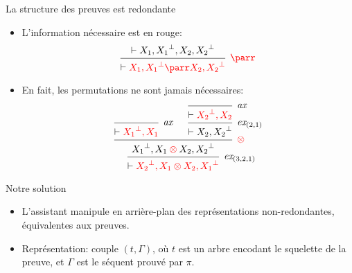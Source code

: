 \documentclass{beamer}
\newcommand*{\orth}{^\perp}
\newcommand*{\tensor}{\otimes}
\newcommand*{\hypv}[1]{\hypo{\vdash #1}}
\newcommand*{\axv}[1]{\infer{0}[\ensuremath{\mathit{ax}}]{\vdash #1}}
\newcommand*{\permv}[2]{\infer{1}[\ensuremath{\textit{ex}_{#1}}]{\vdash #2}}
\newcommand*{\someproof}{\pi}
\newcommand*{\sequent}{\Gamma}
\newcommand*{\foblig}[1]{\textcolor{red}{#1}}
\begin{document}
\begin{frame}{La structure des preuves est redondante}
    \begin{itemize}
        \item L'information nécessaire est en rouge:
            \begin{equation*}
            \begin{prooftree}
                \hypv{X_1, {X_1}\orth, X_2, {X_2}\orth}
                {\infer{1}[\foblig{\ensuremath{\parr}}]{\vdash \foblig{X_1, {X_1}\orth \parr X_2, {X_2}\orth}}}
            \end{prooftree}
            \end{equation*}
            \pause
        \item En fait, les permutations ne sont jamais nécessaires:
            \begin{equation*}
                \begin{prooftree}
                    \axv{\foblig{{X_1}\orth, X_1}}
                    \axv{\foblig{{X_2}\orth, X_2}}
                    \permv{(2, 1)}{X_2, {X_2}\orth}
                    {\infer{2}[\foblig{\ensuremath{\tensor}}]{{X_1}\orth, X_1 \mathbin{\foblig{\tensor}} X_2, {X_2}\orth}}
                    \permv{(3, 2, 1)}{\foblig{{X_2}\orth, X_1 \tensor X_2, {X_1}\orth}}
                \end{prooftree}
            \end{equation*}
    \end{itemize}
\end{frame}

\begin{frame}{Notre solution}
    \begin{itemize}
        \item L'assistant manipule en arrière-plan des représentations non-redondantes, équivalentes aux preuves.
            \pause
        \item Représentation: couple $(t, \sequent)$\pause, où $t$ est un arbre encodant le squelette de la preuve\pause, et $\sequent$ est le séquent prouvé par $\someproof$.
     \end{itemize}
\end{frame}
\end{document}
